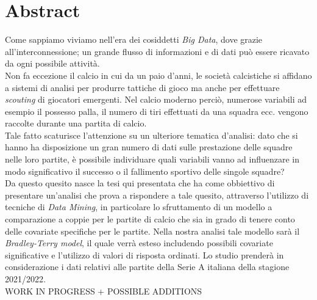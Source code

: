 
\cleardoublepage
{}
{}
\begingroup
\let\clearpage\relax
\let\cleardoublepage\relax
\let\cleardoublepage\relax

\chapter*{Abstract}

Come sappiamo viviamo nell'era dei cosiddetti \emph{Big Data}, dove grazie all'interconnessione; un grande flusso di informazioni e di dati può essere ricavato da ogni possibile attività. \\
Non fa eccezione il calcio in cui da un paio d'anni, le società calcistiche si affidano a sistemi di analisi per produrre tattiche di gioco ma anche per effettuare \textit{scouting} di giocatori emergenti. Nel calcio moderno perciò, numerose variabili ad esempio il possesso palla, il numero di tiri effettuati da una squadra ecc. vengono raccolte durante una partita di calcio.\\
Tale fatto scaturisce l'attenzione su un ulteriore tematica d'analisi: dato che si hanno ha disposizione un gran numero di dati sulle prestazione delle squadre nelle loro partite, è possibile individuare quali variabili vanno ad influenzare in modo significativo il successo o il fallimento sportivo delle singole squadre?\\
Da questo quesito nasce la tesi qui presentata che ha come obbiettivo di presentare un'analisi che prova a rispondere a tale quesito, attraverso l'utilizzo di tecniche di \textit{Data Mining}, in particolare lo sfruttamento di un modello a comparazione a coppie per le partite di calcio che sia in grado di tenere conto delle covariate specifiche per le partite. Nella nostra analisi tale modello sarà il \emph{Bradley-Terry model}, il quale verrà esteso includendo possibili covariate significative e l'utilizzo di valori di risposta ordinati. Lo studio prenderà in considerazione i dati relativi alle partite della Serie A italiana della stagione 2021/2022.\\
 WORK IN PROGRESS + POSSIBLE ADDITIONS






%
%

\endgroup			

\vfill

